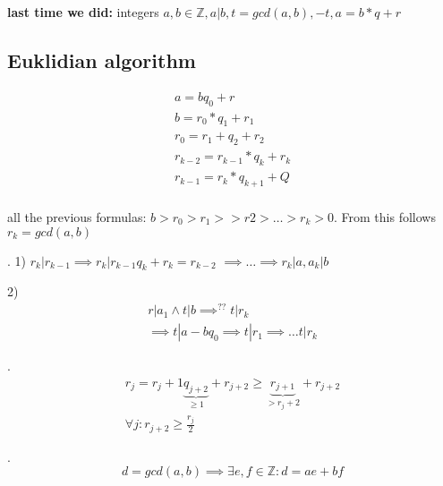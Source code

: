 



\textbf{last time we did:}
integers $a,b \in \mathbb{Z}, a|b, t = gcd(a,b), -t, a = b*q + r$

\subsection{Euklidian algorithm}
\begin{align*}
  a = b q_0 +r \\
  b = r_0*q_1 + r_1 \\
  r_0 = r_1 + q_2 + r_2\\
  r_{k-2} = r_{k-1} * q_k + r_k \\
  r_{k-1} = r_{k} * q_{k+1} + Q \\
\end{align*}

all the previous formulas: $ b > r_0 > r_1 >> r2 > \ldots > r_k > 0$. From this follows $r_k = gcd(a,b)$

\Proof.
1) $r_k | r_{k-1} \implies r_k | r_{k-1} q_k + r_k = r_{k-2}$
  $\implies \ldots \implies r_k | a, a_k | b$

2) 
\begin{align*}
  r | a_1 \wedge t | b \implies^{??} t| r_k \\
  \implies t | a-bq_0 \implies t | r_1 \implies \ldots t|r_k
\end{align*}


\Remark.
\begin{align*}
  r_j = r_j + 1 \underbrace{q_{j+2}}_{ \geq 1} + r_{j+2} \geq \underbrace{r_{j+1}}_{ > r_j+2} + r_{j+2} \\
  \forall j: r_{j+2} \geq \frac{r_j}{2}
\end{align*}

\Theorem.
\[
  d = gcd(a,b) \implies \exists e,f \in \mathbb{Z}: d = ae + bf
\]

